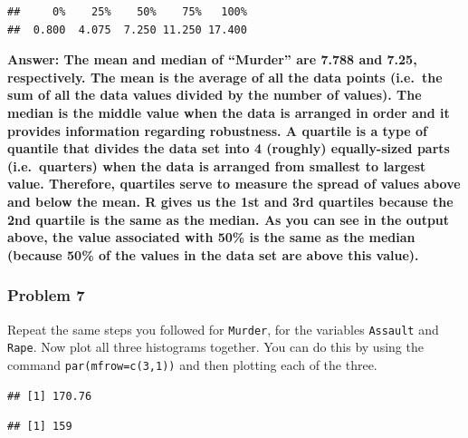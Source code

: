 \documentclass[
]{article}
\newenvironment{Shaded}{\begin{snugshade}}{\end{snugshade}}
\newcommand{\CommentTok}[1]{\textcolor[rgb]{0.56,0.35,0.01}{\textit{#1}}}
\newcommand{\FunctionTok}[1]{\textcolor[rgb]{0.00,0.00,0.00}{#1}}
\newcommand{\NormalTok}[1]{#1}
\newcommand{\SpecialCharTok}[1]{\textcolor[rgb]{0.00,0.00,0.00}{#1}}
\begin{document}
\begin{verbatim}
##     0%    25%    50%    75%   100% 
##  0.800  4.075  7.250 11.250 17.400
\end{verbatim}

\textbf{Answer: The mean and median of ``Murder'' are 7.788 and 7.25,
respectively. The mean is the average of all the data points (i.e.~the
sum of all the data values divided by the number of values). The median
is the middle value when the data is arranged in order and it provides
information regarding robustness. A quartile is a type of quantile that
divides the data set into 4 (roughly) equally-sized parts
(i.e.~quarters) when the data is arranged from smallest to largest
value. Therefore, quartiles serve to measure the spread of values above
and below the mean. R gives us the 1st and 3rd quartiles because the 2nd
quartile is the same as the median. As you can see in the output above,
the value associated with 50\% is the same as the median (because 50\%
of the values in the data set are above this value). }

\hypertarget{problem-7}{%
\subsubsection{Problem 7}\label{problem-7}}

Repeat the same steps you followed for \texttt{Murder}, for the
variables \texttt{Assault} and \texttt{Rape}. Now plot all three
histograms together. You can do this by using the command
\texttt{par(mfrow=c(3,1))} and then plotting each of the three.

\begin{Shaded}
\end{Shaded}

\begin{verbatim}
## [1] 170.76
\end{verbatim}

\begin{Shaded}
\end{Shaded}

\begin{verbatim}
## [1] 159
\end{verbatim}
\end{document}
